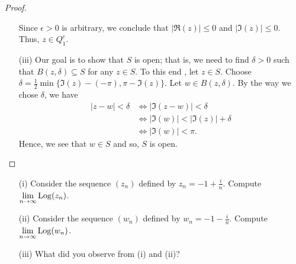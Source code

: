 \documentclass[a4paper]{article}
\begin{document}
\begin{proof}
\begin{enumerate}
        Since \( \epsilon > 0  \) is arbitrary, we conclude that \( | \Re(z) | \leq 0  \) and \( | \Im(z) | \leq 0  \). Thus, \( z \in {Q}_{1}^{c} \).
    \item[(iii)] Our goal is to show that \( S  \) is open; that is, we need to find \( \delta > 0  \) such that \( B(z,\delta) \subseteq  S  \) for any \( z \in S  \). To this end , let \( z \in S  \). Choose \( \delta = \frac{ 1 }{ 2 }  \min \{ \Im(z) - (-\pi), \pi - \Im(z) \}  \). Let \( w \in B(z,\delta) \). By the way we chose \( \delta \), we have
        \begin{align*}
            | z - w  | < \delta &\iff | \Im(z-w) | < \delta  \\
                                &\iff | \Im(w) | < | \Im(z) | + \delta \\
                                &\iff | \Im(w) | < \pi.
        \end{align*}
        Hence, we see that \( w \in S  \) and so, \( S  \) is open.

\end{enumerate}
\end{proof}

\begin{problem}
    \begin{enumerate}
        \item[(i)] Consider the sequence \( ({z}_{n}) \) defined by \( {z}_{n} = - 1 + \frac{ i }{ n }  \). Compute \( \lim_{ n \to \infty  }  \Log({z}_{n}) \). 
        \item[(ii)] Consider the sequence \( ({w}_{n}) \) defined by \( {w}_{n} = - 1 - \frac{ i }{ n }  \). Compute \( \lim_{ n \to \infty  }  \Log({w}_{n}) \).
        \item[(iii)] What did you observe from (i) and (ii)?
    \end{enumerate}
\end{problem}
\end{document}
